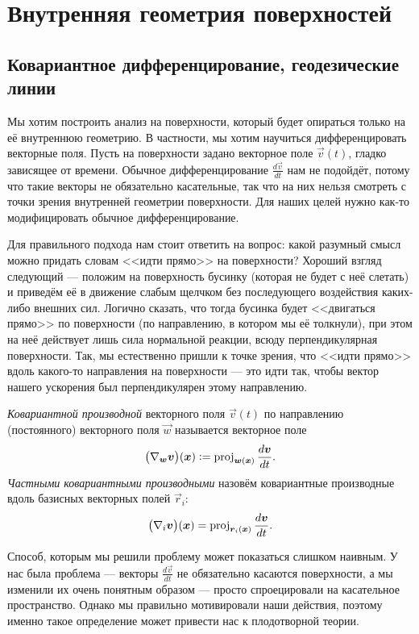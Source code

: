 \section{Внутренняя геометрия поверхностей}

\subsection{Ковариантное дифференцирование, геодезические линии}

Мы хотим построить анализ на поверхности, который будет опираться только на её внутреннюю геометрию. В частности, мы хотим научиться дифференцировать векторные поля. Пусть на поверхности задано векторное поле $\vec{v}(t)$, гладко зависящее от времени. Обычное дифференцирование $\frac{d\vec{v}}{dt}$ нам не подойдёт, потому что такие векторы не обязательно касательные, так что на них нельзя смотреть с точки зрения внутренней геометрии поверхности. Для наших целей нужно как-то модифицировать обычное дифференцирование.

Для правильного подхода нам стоит ответить на вопрос: какой разумный смысл можно придать словам <<идти прямо>> на поверхности? Хороший взгляд следующий --- положим на поверхность бусинку (которая не будет с неё слетать) и приведём её в движение слабым щелчком без последующего воздействия каких-либо внешних сил. Логично сказать, что тогда бусинка будет <<двигаться прямо>> по поверхности (по направлению, в котором мы её толкнули), при этом на неё действует лишь сила нормальной реакции, всюду перпендикулярная поверхности.  Так, мы естественно пришли к точке зрения, что <<идти прямо>> вдоль какого-то направления на поверхности --- это идти так, чтобы вектор нашего ускорения был перпендикулярен этому направлению.

\begin{definition}
	\textit{Ковариантной производной} векторного поля $\vec{v}(t)$ по направлению (постоянного) векторного поля $\vec{w}$ называется векторное поле
	\[
		\big(\nabla_{\boldsymbol{w}}\boldsymbol{v}\big)(\boldsymbol{x}) \vcentcolon = \operatorname{proj}_{\boldsymbol{w}(\boldsymbol{x})}\frac{d\boldsymbol{v}}{dt}.
	\]
	\textit{Частными ковариантными производными} назовём ковариантные производные вдоль базисных векторных полей $\vec{r}_i$:
	\[
		\big(\nabla_i\boldsymbol{v}\big)(\boldsymbol{x}) = \operatorname{proj}_{\boldsymbol{r}_i(\boldsymbol{x})}\frac{d\boldsymbol{v}}{dt}.
	\]
\end{definition}

Способ, которым мы решили проблему может показаться слишком наивным. У нас была проблема --- векторы $\frac{d\vec{v}}{dt}$ не обязательно касаются поверхности, а мы изменили их очень понятным образом --- просто спроецировали на касательное пространство. Однако мы правильно мотивировали наши действия, поэтому именно такое определение может привести нас к плодотворной теории.

